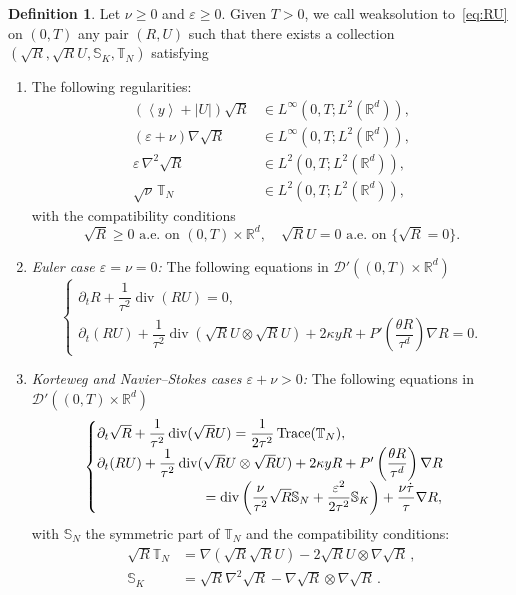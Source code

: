 \documentclass[10pt]{amsart}
\theoremstyle{definition}\newtheorem{defi}[theo]{Definition}\newtheorem{rema}[theo]{Remark}\newtheorem{exam}[theo]{Example}\newtheorem{exem}[theo]{Example}\newtheorem{nota}[theo]{Notation}
\DeclareMathOperator{\DIV}{div}
\DeclareMathOperator{\Trace}{Trace}
\newcommand*\R{\mathbb{R}}
\newcommand*\<{\left\langle}
\renewcommand*\>{\right\rangle}
\renewcommand*\ge{\geqslant}
\newcommand*\eps{\varepsilon}
\begin{document}
\begin{defi}\label{def_weaksol}
Let $\nu \ge 0$ and $\varepsilon \ge 0.$ Given $T >0$, we call weak\linebreak solution to~\eqref{eq:RU} on $(0,T)$ any pair $(R,U)$ such that there exists a collection\linebreak $(\sqrt{R},\sqrt{R}U,\mathbb S_{K},\mathbb T_{N})$ satisfying
\begin{enumerate}
\item \label{2.6.1} The following regularities:
\begin{align*}
\left(\<y\>+|U|\right) \sqrt{R} &\in L^{\infty}\left(0,T; L^2 (\R^d)\right),\\
(\eps+\nu)\nabla \sqrt R &\in L^{\infty}\left(0,T; L^2 (\R^d)\right),\\
\varepsilon \, \nabla^2 \sqrt{R} &\in L^2(0,T;L^2(\mathbb R^d)),\\
\sqrt \nu \, \mathbb T_N &\in L^2(0,T; L^2(\mathbb R^d)),
\end{align*}
with the compatibility conditions
\[
\sqrt{R} \ge 0 \text{ a.e. on } (0,T)\times \R^d, \quad \sqrt{R}U= 0 \text{ a.e. on } \{\sqrt{R} = 0 \}.
\]

\item \label{2.6.2} \emph{Euler case $\eps=\nu=0$:} The following equations in $\mathcal D'((0,T)\times \mathbb R^d)$
\begin{equation}\label{eq:NSKrevu-euler}
\begin{cases}
\partial_t{R}+\dfrac{1}{\tau^2}\DIV ({R} U)= 0,\\
\partial_t ({R}U) +\dfrac{1}{\tau^2}\DIV (\sqrt{R}U \otimes \sqrt{R}U) +2\kappa y R + P'\left(\dfrac{\theta R}{\tau^d}\right)\nabla R =0.
\end{cases}
\end{equation}

\item \label{2.6.3} \emph{Korteweg and Navier--Stokes cases $\eps + \nu > 0$:} The following equations in $\mathcal D'((0,T)\times \mathbb R^d)$
\begin{equation}\label{eq:NSKrevu}
\begin{cases}
\partial_t\sqrt{R}+\dfrac{1}{\tau^2}\DIV(\sqrt{R}U)=\dfrac{1}{2\tau^2}\Trace(\mathbb T_N),\\
\partial_t ({R}U) +\dfrac{1}{\tau^2}\DIV (\sqrt{R}U \otimes \sqrt{R}U) +2\kappa y R + P'\left(\dfrac{\theta R}{\tau^d}\right)\nabla R\\
\mkern 140mu =\DIV \left(\dfrac{\nu}{\tau^2} \sqrt R \mathbb S_N + \dfrac{\varepsilon^2}{2\tau^2} \mathbb S_K\right) + \dfrac{\nu \dot{\tau}}{\tau} \nabla R,
\end{cases}
\end{equation}
with $\mathbb S_N$ the symmetric part of $\mathbb T_N$ and the compatibility conditions:
\begin{align}\label{eq_compnewton}
\sqrt{R}\mathbb T_{N} &= \nabla(\sqrt{R} \sqrt{R} U) - 2 \sqrt{R}U \otimes \nabla \sqrt{R}\,, \\
\mathbb S_K &=\sqrt{R}\nabla^2 \sqrt{R} - \nabla \sqrt{R} \otimes \nabla \sqrt{R}
\,. \label{eq_compkorteweg}
\end{align}
\end{enumerate}
\end{defi}
\end{document}
